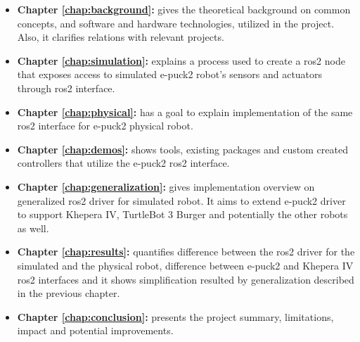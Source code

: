 \begin{itemize}
    \item \textbf{Chapter \ref{chap:background}: } gives the theoretical background on common concepts, and software and hardware technologies, utilized in the project.
    Also, it clarifies relations with relevant projects.
    
    \item \textbf{Chapter \ref{chap:simulation}: } explains a process used to create a \ac{ros2} node that exposes access to simulated e-puck2 robot's sensors and actuators through \ac{ros2} interface.
    
    \item \textbf{Chapter \ref{chap:physical}: } has a goal to explain implementation of the same \ac{ros2} interface for e-puck2 physical robot.
    
    \item \textbf{Chapter \ref{chap:demos}: } shows tools, existing packages and custom created controllers that utilize the e-puck2 \ac{ros2} interface.
    
    \item \textbf{Chapter \ref{chap:generalization}: } gives implementation overview on generalized \ac{ros2} driver for simulated robot. It aims to extend e-puck2 driver to support Khepera IV, TurtleBot 3 Burger and potentially the other robots as well.
    
    \item \textbf{Chapter \ref{chap:results}: } quantifies difference between the \ac{ros2} driver for the simulated and the physical robot, difference between e-puck2 and Khepera IV \ac{ros2} interfaces and it shows simplification resulted by generalization described in the previous chapter.
    
    \item \textbf{Chapter \ref{chap:conclusion}: } presents the project summary, limitations, impact and potential improvements.
\end{itemize}